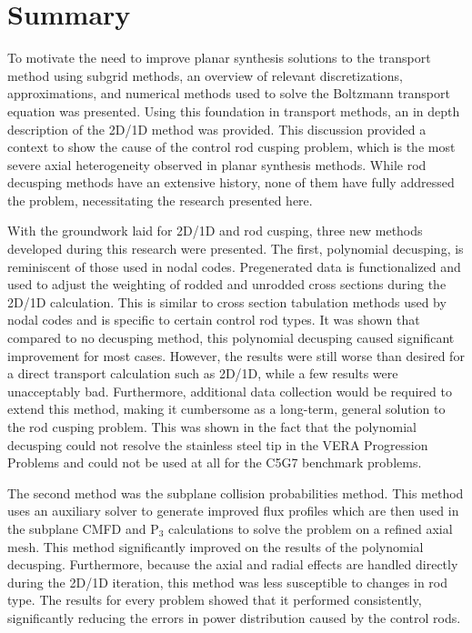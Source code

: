 \section{Summary}

To motivate the need to improve planar synthesis solutions to the transport method using subgrid methods, an overview of relevant discretizations, approximations, and numerical methods used to solve the Boltzmann transport equation was presented.  Using this foundation in transport methods, an in depth description of the 2D/1D method was provided.  This discussion provided a context to show the cause of the control rod cusping problem, which is the most severe axial heterogeneity observed in planar synthesis methods.  While rod decusping methods have an extensive history, none of them have fully addressed the problem, necessitating the research presented here.

With the groundwork laid for 2D/1D and rod cusping, three new methods developed during this research were presented.  The first, polynomial decusping, is reminiscent of those used in nodal codes.  Pregenerated data is functionalized and used to adjust the weighting of rodded and unrodded cross sections during the 2D/1D calculation.  This is similar to cross section tabulation methods used by nodal codes and is specific to certain control rod types.  It was shown that compared to no decusping method, this polynomial decusping caused significant improvement for most cases.  However, the results were still worse than desired for a direct transport calculation such as 2D/1D, while a few results were unacceptably bad.  Furthermore, additional data collection would be required to extend this method, making it cumbersome as a long-term, general solution to the rod cusping problem.  This was shown in the fact that the polynomial decusping could not resolve the stainless steel tip in the VERA Progression Problems and could not be used at all for the C5G7 benchmark problems.

The second method was the subplane collision probabilities method.  This method uses an auxiliary solver to generate improved flux profiles which are then used in the subplane CMFD and P$_3$ calculations to solve the problem on a refined axial mesh.  This method significantly improved on the results of the polynomial decusping.  Furthermore, because the axial and radial effects are handled directly during the 2D/1D iteration, this method was less susceptible to changes in rod type.  The results for every problem showed that it performed consistently, significantly reducing the errors in power distribution caused by the control rods.

